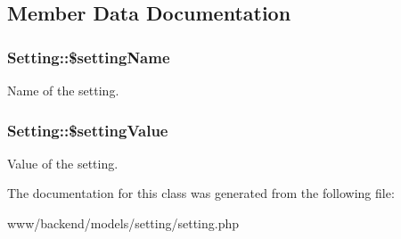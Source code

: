 \subsection{Member Data Documentation}
\hypertarget{classSetting_a59ac482046073fcae2656721ff8f8f02}{
\subsubsection[{\$settingName}]{\setlength{\rightskip}{0pt plus 5cm}Setting::\$settingName}}
\label{classSetting_a59ac482046073fcae2656721ff8f8f02}
Name of the setting. \hypertarget{classSetting_a68d581b6c71b46423725f4ea9361b1a4}{
\subsubsection[{\$settingValue}]{\setlength{\rightskip}{0pt plus 5cm}Setting::\$settingValue}}
\label{classSetting_a68d581b6c71b46423725f4ea9361b1a4}
Value of the setting. 

The documentation for this class was generated from the following file:\begin{DoxyCompactItemize}
\item 
www/backend/models/setting/setting.php\end{DoxyCompactItemize}
